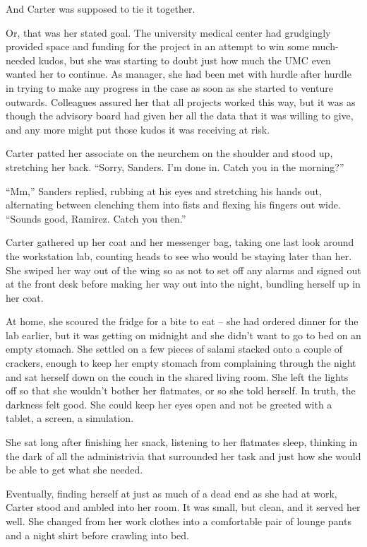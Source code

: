 And Carter was supposed to tie it together.

Or, that was her stated goal.  The university medical center had grudgingly provided space and funding for the project in an attempt to win some much-needed kudos, but she was starting to doubt just how much the UMC even wanted her to continue.  As manager, she had been met with hurdle after hurdle in trying to make any progress in the case as soon as she started to venture outwards.  Colleagues assured her that all projects worked this way, but it was as though the advisory board had given her all the data that it was willing to give, and any more might put those kudos it was receiving at risk.

Carter patted her associate on the neurchem on the shoulder and stood up, stretching her back.  ``Sorry, Sanders.  I'm done in.  Catch you in the morning?''

``Mm,'' Sanders replied, rubbing at his eyes and stretching his hands out, alternating between clenching them into fists and flexing his fingers out wide.  ``Sounds good, Ramirez.  Catch you then.''

Carter gathered up her coat and her messenger bag, taking one last look around the workstation lab, counting heads to see who would be staying later than her.  She swiped her way out of the wing so as not to set off any alarms and signed out at the front desk before making her way out into the night, bundling herself up in her coat.

At home, she scoured the fridge for a bite to eat -- she had ordered dinner for the lab earlier, but it was getting on midnight and she didn't want to go to bed on an empty stomach.  She settled on a few pieces of salami stacked onto a couple of crackers, enough to keep her empty stomach from complaining through the night and sat herself down on the couch in the shared living room.  She left the lights off so that she wouldn't bother her flatmates, or so she told herself.  In truth, the darkness felt good.  She could keep her eyes open and not be greeted with a tablet, a screen, a simulation.

She sat long after finishing her snack, listening to her flatmates sleep, thinking in the dark of all the administrivia that surrounded her task and just how she would be able to get what she needed.

Eventually, finding herself at just as much of a dead end as she had at work, Carter stood and ambled into her room.  It was small, but clean, and it served her well.  She changed from her work clothes into a comfortable pair of lounge pants and a night shirt before crawling into bed.

